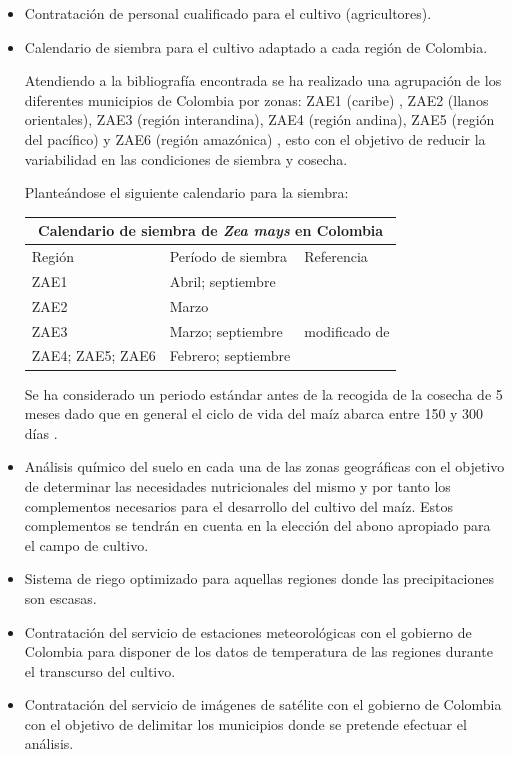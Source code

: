 \documentclass[12pt, spanish]{article}
\begin{document}
\begin{itemize}
    \item Contratación de personal cualificado para el cultivo (agricultores).
    \item Calendario de siembra para el cultivo adaptado a cada región de Colombia.
    
Atendiendo a la bibliografía encontrada se ha realizado una agrupación de los diferentes municipios de Colombia por zonas: ZAE1 (caribe) , ZAE2 (llanos orientales), ZAE3 (región interandina), ZAE4 (región andina), ZAE5 (región del pacífico)  y ZAE6 (región amazónica) \cite{ref4}, esto con el objetivo de reducir la variabilidad en las condiciones de siembra y cosecha.

Planteándose el siguiente calendario para la siembra:

\begin{tabular}{ |p{5cm}|p{5cm}|p{5cm}|  }
\hline
\multicolumn{3}{|c|}{Calendario de siembra de \textit{Zea mays} en Colombia} \\
\hline
Región & Período de siembra & Referencia  \\
\hline
ZAE1 & Abril; septiembre &  \\
ZAE2 & Marzo  &  \\
ZAE3 & Marzo; septiembre & modificado de \cite{ref4} \\
ZAE4; ZAE5; ZAE6 & Febrero; septiembre &  \\
\hline
\end{tabular}

Se ha considerado un periodo estándar antes de la recogida de la cosecha de 5 meses dado que en general el ciclo de vida del maíz abarca entre 150 y 300 días \cite{ref5}.

\item Análisis químico del suelo en cada una de las zonas geográficas con el objetivo de determinar las necesidades nutricionales del mismo y por tanto los complementos necesarios para el desarrollo del cultivo del maíz. Estos complementos se tendrán en cuenta en la elección del abono apropiado para el campo de cultivo.

\item Sistema de riego optimizado para aquellas regiones donde las precipitaciones son escasas.

\item Contratación del servicio de estaciones meteorológicas con el gobierno de Colombia para disponer de los datos de temperatura de las regiones durante el transcurso del cultivo.

\item Contratación del servicio de imágenes de satélite con el gobierno de Colombia con el objetivo de delimitar los municipios donde se pretende efectuar el análisis. 

\end{itemize}
\end{document}
